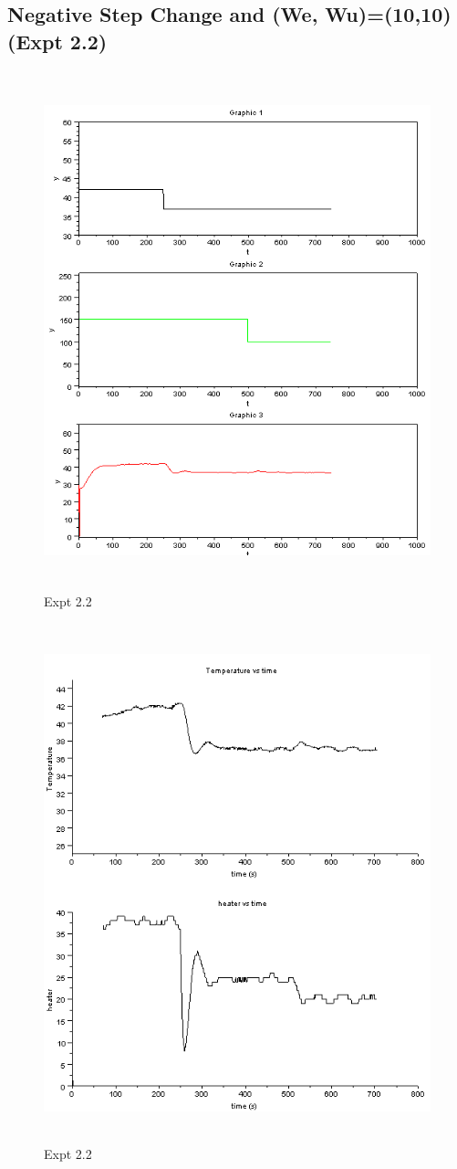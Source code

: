 \subsection{Negative Step Change and (We, Wu)=(10,10) (Expt 2.2) }
\begin{figure}[H]
  \includegraphics[width=12cm, height=15cm]{mpc/2_2.PNG}
  \caption{Expt 2.2}
\end{figure}
\begin{figure}[H]
  \includegraphics[width=12cm, height=15cm]{mpc/2_2_heater_final.png}
  \caption{Expt 2.2}
\end{figure}


